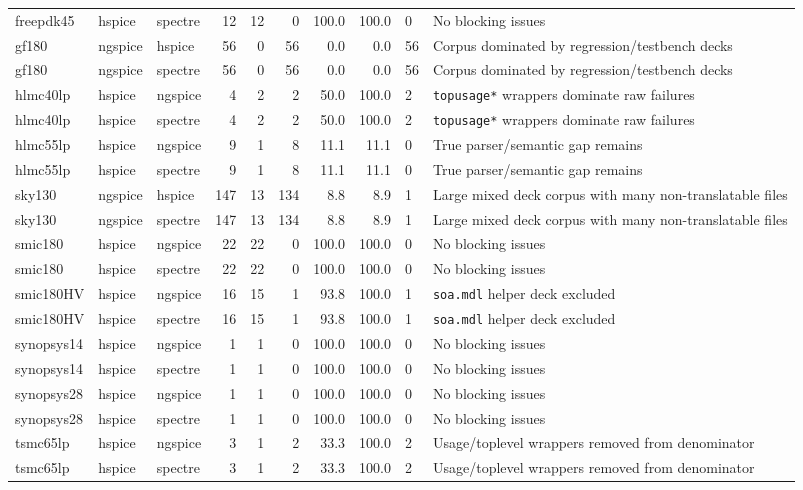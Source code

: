\documentclass[12pt,a4paper,oneside]{report}
\begin{document}
\begin{landscape}
\begin{longtable}{p{2.2cm}p{1.6cm}p{1.5cm}r r r r r p{2.8cm}p{4.6cm}}
freepdk45 & hspice & spectre & 12 & 12 & 0 & 100.0 & 100.0 & 0 & No blocking issues \\
gf180 & ngspice & hspice & 56 & 0 & 56 & 0.0 & 0.0 & 56 & Corpus dominated by regression/testbench decks \\
gf180 & ngspice & spectre & 56 & 0 & 56 & 0.0 & 0.0 & 56 & Corpus dominated by regression/testbench decks \\
hlmc40lp & hspice & ngspice & 4 & 2 & 2 & 50.0 & 100.0 & 2 & \texttt{topusage*} wrappers dominate raw failures \\
hlmc40lp & hspice & spectre & 4 & 2 & 2 & 50.0 & 100.0 & 2 & \texttt{topusage*} wrappers dominate raw failures \\
hlmc55lp & hspice & ngspice & 9 & 1 & 8 & 11.1 & 11.1 & 0 & True parser/semantic gap remains \\
hlmc55lp & hspice & spectre & 9 & 1 & 8 & 11.1 & 11.1 & 0 & True parser/semantic gap remains \\
sky130 & ngspice & hspice & 147 & 13 & 134 & 8.8 & 8.9 & 1 & Large mixed deck corpus with many non-translatable files \\
sky130 & ngspice & spectre & 147 & 13 & 134 & 8.8 & 8.9 & 1 & Large mixed deck corpus with many non-translatable files \\
smic180 & hspice & ngspice & 22 & 22 & 0 & 100.0 & 100.0 & 0 & No blocking issues \\
smic180 & hspice & spectre & 22 & 22 & 0 & 100.0 & 100.0 & 0 & No blocking issues \\
smic180HV & hspice & ngspice & 16 & 15 & 1 & 93.8 & 100.0 & 1 & \texttt{soa.mdl} helper deck excluded \\
smic180HV & hspice & spectre & 16 & 15 & 1 & 93.8 & 100.0 & 1 & \texttt{soa.mdl} helper deck excluded \\
synopsys14 & hspice & ngspice & 1 & 1 & 0 & 100.0 & 100.0 & 0 & No blocking issues \\
synopsys14 & hspice & spectre & 1 & 1 & 0 & 100.0 & 100.0 & 0 & No blocking issues \\
synopsys28 & hspice & ngspice & 1 & 1 & 0 & 100.0 & 100.0 & 0 & No blocking issues \\
synopsys28 & hspice & spectre & 1 & 1 & 0 & 100.0 & 100.0 & 0 & No blocking issues \\
tsmc65lp & hspice & ngspice & 3 & 1 & 2 & 33.3 & 100.0 & 2 & Usage/toplevel wrappers removed from denominator \\
tsmc65lp & hspice & spectre & 3 & 1 & 2 & 33.3 & 100.0 & 2 & Usage/toplevel wrappers removed from denominator \\
\bottomrule
\end{longtable}
\end{landscape}
\end{document}
